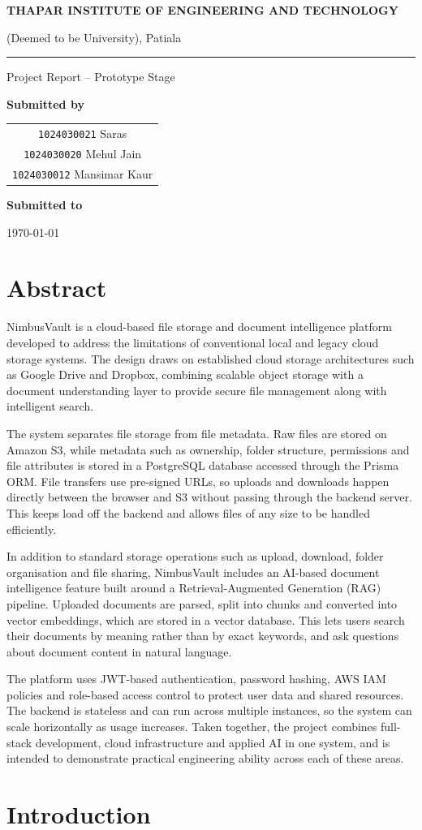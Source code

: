 \documentclass[11pt,a4paper,oneside]{report}
\author{%
  \texttt{1024030021} Saras \\
  \texttt{1024030020} Mehul Jain \\
  \texttt{1024030012} Mansimar Kaur%
}
\newcommand{\TIETHeader}{}
\newcommand{\TIETProjectTitle}{}
\newcommand{\TIETProjectSubTitle}{}
\newcommand{\TIETSubText}{}
\newcommand{\TIETAdvisor}{}
\newcommand{\TIETFooterText}{}
\renewcommand{\maketitle}{%
  \begin{titlepage}
    \thispagestyle{empty}
    \centering
    \vspace*{0.8cm}
    {\large\bfseries THAPAR INSTITUTE OF ENGINEERING AND TECHNOLOGY\par}
    \vspace{0.15cm}
    {\normalsize (Deemed to be University), Patiala\par}
    \vspace{0.35cm}
    \rule{\linewidth}{0.8pt}\par
    \vspace{0.8cm}
    {\large\bfseries \TIETHeader\par}
    \vspace{1.8cm}
    {\Large\bfseries \TIETProjectTitle\par}
    \vspace{0.4cm}
    {\large \TIETProjectSubTitle\par}
    \vspace{1.2cm}
    {\large Project Report -- Prototype Stage\par}
    \vspace{0.8cm}
    \begin{minipage}{0.85\textwidth}
      \centering
      \TIETSubText
    \end{minipage}\par
    \vspace{1cm}
    {\bfseries Submitted by\par}
    \vspace{0.2cm}
    \begin{tabular}{c}
      \texttt{1024030021} Saras\\
      \texttt{1024030020} Mehul Jain\\
      \texttt{1024030012} Mansimar Kaur
    \end{tabular}\par
    \vspace{0.8cm}
    {\bfseries Submitted to\par}
    \vspace{0.2cm}
    {\TIETAdvisor\par}
    \vfill
    \begin{minipage}{0.9\textwidth}
      \centering
      \TIETFooterText
    \end{minipage}\par
    \vspace{0.4cm}
    {\today\par}
  \end{titlepage}
}
\begin{document}
\maketitle
\tableofcontents

\chapter*{Abstract}

NimbusVault is a cloud-based file storage and document intelligence platform developed to address the limitations of conventional local and legacy cloud storage systems. The design draws on established cloud storage architectures such as Google Drive and Dropbox, combining scalable object storage with a document understanding layer to provide secure file management along with intelligent search.

The system separates file storage from file metadata. Raw files are stored on Amazon S3, while metadata such as ownership, folder structure, permissions and file attributes is stored in a PostgreSQL database accessed through the Prisma ORM. File transfers use pre-signed URLs, so uploads and downloads happen directly between the browser and S3 without passing through the backend server. This keeps load off the backend and allows files of any size to be handled efficiently.

In addition to standard storage operations such as upload, download, folder organisation and file sharing, NimbusVault includes an AI-based document intelligence feature built around a Retrieval-Augmented Generation (RAG) pipeline. Uploaded documents are parsed, split into chunks and converted into vector embeddings, which are stored in a vector database. This lets users search their documents by meaning rather than by exact keywords, and ask questions about document content in natural language.

The platform uses JWT-based authentication, password hashing, AWS IAM policies and role-based access control to protect user data and shared resources. The backend is stateless and can run across multiple instances, so the system can scale horizontally as usage increases. Taken together, the project combines full-stack development, cloud infrastructure and applied AI in one system, and is intended to demonstrate practical engineering ability across each of these areas.



\chapter{Introduction}
\end{document}
